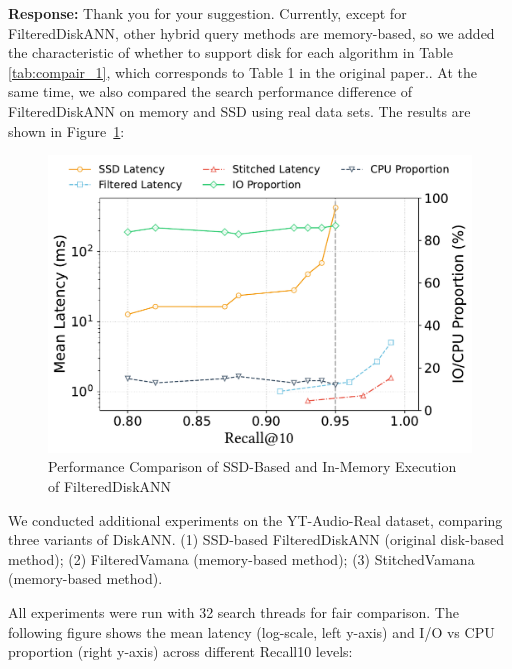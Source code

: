 \documentclass[sigconf, nonacm]{acmart}
\begin{document}
\noindent
\textbf{Response:} 
Thank you for your suggestion. Currently, except for FilteredDiskANN, other hybrid query methods are memory-based, so we added the characteristic of whether to support disk for each algorithm in Table \ref{tab:compair_1}, which corresponds to Table 1 in the original paper.. At the same time, we also compared the search performance difference of FilteredDiskANN on memory and SSD using real data sets. The results are shown in Figure~\ref{fig:recall-latency}:
\begin{figure}[htbp]
	\centering
	\includegraphics[width=\linewidth]{fig/recall_latency_all.pdf}
	\caption{Performance Comparison of SSD-Based and In-Memory Execution of FilteredDiskANN}
	\label{fig:recall-latency}
\end{figure}

We conducted additional experiments on the YT-Audio-Real dataset, comparing three variants of DiskANN.
(1) SSD-based FilteredDiskANN (original disk-based method);
(2) FilteredVamana (memory-based method);
(3) StitchedVamana (memory-based method).




All experiments were run with 32 search threads for fair comparison. The following figure shows the mean latency (log-scale, left y-axis) and I/O vs CPU proportion (right y-axis) across different Recall\@10 levels:
\end{document}
